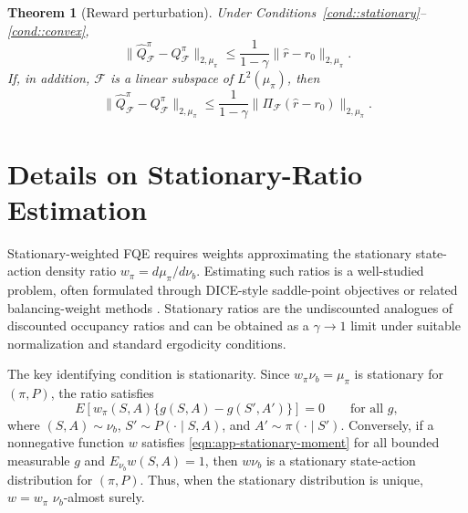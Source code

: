 \documentclass{article}
\theoremstyle{plain}
\newtheorem{theorem}{Theorem}
\theoremstyle{definition}
\theoremstyle{remark}
\begin{document}
\begin{theorem}[Reward perturbation]
\label{theorem:reward-perturbation}
Under Conditions~\ref{cond::stationary}--\ref{cond::convex},
\[
\|\widehat Q^\pi_{\mathcal F}-Q^\pi_{\mathcal F}\|_{2,\mu_\pi}
\le
\frac{1}{1-\gamma}
\|\widehat r-r_0\|_{2,\mu_\pi}.
\]
If, in addition, \(\mathcal F\) is a linear subspace of \(L^2(\mu_\pi)\), then
\[
\|\widehat Q^\pi_{\mathcal F}-Q^\pi_{\mathcal F}\|_{2,\mu_\pi}
\le
\frac{1}{1-\gamma}
\|\Pi_{\mathcal F}(\widehat r-r_0)\|_{2,\mu_\pi}.
\]
\end{theorem}


 
 




\section{Details on Stationary-Ratio Estimation}
\label{app:ratio-estimation}

Stationary-weighted FQE requires weights approximating the stationary
state-action density ratio \(w_\pi=d\mu_\pi/d\nu_b\). Estimating such ratios is a well-studied
problem, often formulated through DICE-style saddle-point objectives
\citep{nachum2019dualdice,zhang2020gendice,lee2021optidice} or related
balancing-weight methods \citep{uehara2020minimax,wang2023projected}.
Stationary ratios are the undiscounted analogues of discounted occupancy ratios
and can be obtained as a \(\gamma\to1\) limit under suitable normalization and
standard ergodicity conditions.

The key identifying condition is stationarity. Since \(w_\pi\nu_b=\mu_\pi\) is
stationary for \((\pi,P)\), the ratio satisfies
\begin{equation}
\label{eqn:app-stationary-moment}
E\!\left[
w_\pi(S,A)\{g(S,A)-g(S',A')\}
\right]=0
\qquad \text{for all } g,
\end{equation}
where \((S,A)\sim\nu_b\), \(S'\sim P(\cdot\mid S,A)\), and
\(A'\sim\pi(\cdot\mid S')\). Conversely, if a nonnegative function \(w\)
satisfies \eqref{eqn:app-stationary-moment} for all bounded measurable \(g\)
and \(E_{\nu_b}w(S,A)=1\), then \(w\nu_b\) is a stationary state-action
distribution for \((\pi,P)\). Thus, when the stationary distribution is unique,
\(w=w_\pi\) \(\nu_b\)-almost surely.
\end{document}
